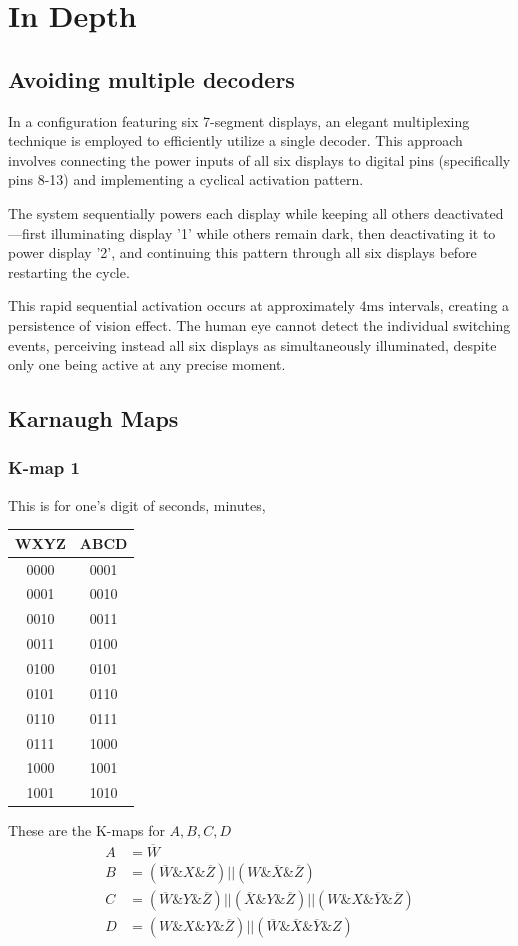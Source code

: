 \documentclass[a4paper,12pt]{article}
\begin{document}
\section*{In Depth}
\subsection*{Avoiding multiple decoders}
In a configuration featuring six 7-segment displays, an elegant multiplexing technique is employed to efficiently utilize a single decoder. This approach involves connecting the power inputs of all six displays to digital pins (specifically pins 8-13) and implementing a cyclical activation pattern. 

The system sequentially powers each display while keeping all others deactivated—first illuminating display '1' while others remain dark, then deactivating it to power display '2', and continuing this pattern through all six displays before restarting the cycle. 

This rapid sequential activation occurs at approximately \(4\text{ms}\) intervals, creating a persistence of vision effect. The human eye cannot detect the individual switching events, perceiving instead all six displays as simultaneously illuminated, despite only one being active at any precise moment.
\subsection*{Karnaugh Maps}

\subsubsection*{K-map 1}
This is for one's digit of seconds, minutes, \newline \newline
\begin{tabular}{|c|c|}
\hline
WXYZ & ABCD \\
\hline
0000 & 0001 \\
0001 & 0010 \\
0010 & 0011 \\
0011 & 0100 \\
0100 & 0101 \\
0101 & 0110 \\
0110 & 0111 \\
0111 & 1000 \\
1000 & 1001 \\
1001 & 1010 \\
\hline
\end{tabular}
\newline
\newline These are the K-maps for $A, B, C, D$
\begin{align*}
A &= \overline{W} \\
B &= (\overline{W} \& X \& \overline{Z})  ||  (W \& \overline{X} \& \overline{Z}) \\
C &= (\overline{W} \& Y \& \overline{Z})  ||  (\overline{X} \& Y \& \overline{Z}) || (W \& X \& \overline{Y} \& \overline{Z}) \\
D &= (W \& X \& Y \& \overline{Z})  ||  (\overline{W} \& \overline{X} \& \overline{Y} \& Z)
\end{align*}
\end{document}
